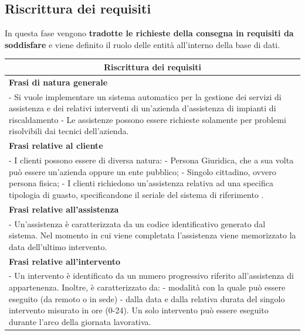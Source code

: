 \documentclass[legalpaper]{article}
\begin{document}
\subsection{Riscrittura dei requisiti}
In questa fase vengono \textbf{tradotte le richieste della consegna in requisiti da soddisfare} e viene definito il ruolo delle entità all'interno della base di dati.\\
\newline
\renewcommand\arraystretch{1,5}
\begin{tabular}{ |p{16 cm}| }
\hline
\multicolumn{1}{|c|}{\textbf{Riscrittura dei requisiti}} \\
\hline
\textbf{Frasi di natura generale}  \\
\hline
- Si vuole implementare un sistema automatico per la gestione dei servizi di assistenza e dei relativi interventi di un'azienda d'assistenza di impianti di riscaldamento \newline
- Le assistenze possono essere richieste solamente per problemi risolvibili dai tecnici dell'azienda.\\ \hline
\textbf{Frasi relative al cliente}  \\
\hline
-  I clienti possono essere di diversa natura:
- Persona Giuridica, che a sua volta può essere un'azienda oppure un ente pubblico; \newline
- Singolo cittadino, ovvero persona fisica; \newline
- I clienti richiedono un'assistenza relativa ad una specifica tipologia di guasto, specificandone il seriale del sistema di riferimento .\\
\hline
\textbf{Frasi relative all'assistenza}  \\
\hline
- Un'assistenza è caratterizzata da un codice identificativo generato dal sistema. Nel momento in cui viene completata l'assistenza viene memorizzato la data dell'ultimo intervento.\\
\hline
\textbf{Frasi relative all'intervento}  \\
\hline
- Un intervento è identificato da un numero progressivo riferito all'assistenza di appartenenza. Inoltre, è caratterizzato da: \newline
- modalità con la quale può essere eseguito (da remoto o in sede)\newline
- dalla data e dalla relativa durata del singolo intervento misurato in ore (0-24). \newline 
Un solo intervento può essere eseguito durante l'arco della giornata lavorativa.\\

\end{tabular}
\end{document}

